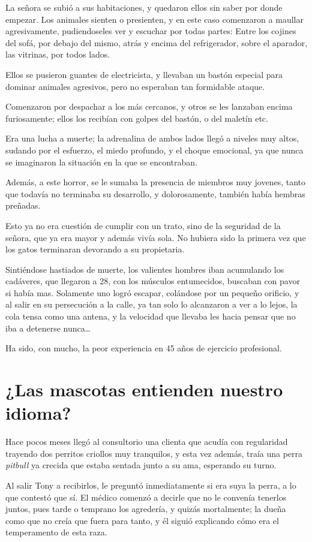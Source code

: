 \documentclass[letterpaper, 12pt]{book}
\begin{document}
La señora se subió a sus habitaciones, y quedaron ellos sin saber por donde empezar. Los animales sienten o presienten, y en este caso comenzaron a maullar agresivamente, pudiendoseles ver y escuchar por todas partes: Entre los cojines del sofá, por debajo del mismo, atrás y encima del refrigerador, sobre el aparador, las vitrinas, por todos lados. 

Ellos se pusieron guantes de electricista, y llevaban un bastón especial para dominar animales agresivos, pero no esperaban tan formidable ataque.

Comenzaron por despachar a los más cercanos, y otros se les lanzaban encima furiosamente; ellos los recibían con golpes del bastón, o del maletín etc.

Era una lucha a muerte; la adrenalina de ambos lados llegó a niveles muy altos, sudando por el esfuerzo, el miedo profundo, y el choque emocional, ya que nunca se imaginaron la situación en la que se encontraban.

Además, a este horror, se le sumaba la presencia de miembros muy jovenes, tanto que todavía no terminaba su desarrollo, y dolorosamente, también había hembras preñadas.

Esto ya no era cuestión de cumplir con un trato, sino de la seguridad de la señora, que ya era mayor y además vivía sola. No hubiera sido la primera vez que los gatos terminaran devorando a su propietaria.

Sintiéndose hastiados de muerte, los valientes hombres iban acumulando los cadáveres, que llegaron a 28, con los músculos entumecidos, buscaban con pavor si había mas. Solamente uno logró escapar, colándose por un pequeño orificio, y al salir en su persecución a la calle, ya tan solo lo alcanzaron a ver a lo lejos, la cola tensa como una antena, y la velocidad que llevaba les hacia pensar que no iba a detenerse nunca\ldots

Ha sido, con mucho, la peor experiencia en 45 años de ejercicio profesional.

\chapter{¿Las mascotas entienden nuestro idioma?}
Hace pocos meses llegó al consultorio una clienta que acudía con regularidad trayendo dos perritos criollos muy tranquilos, y esta vez además, traía una perra \textit{pitbull} ya crecida que estaba sentada junto a su ama, esperando su turno.

Al salir Tony a recibirlos, le preguntó inmediatamente si era suya la perra, a lo que contestó que sí. El médico comenzó a decirle que no le convenía tenerlos juntos, pues tarde o temprano los agredería, y quizás mortalmente; la dueña como que no creía que fuera para tanto, y él siguió explicando cómo era el temperamento de esta raza.
\end{document}
